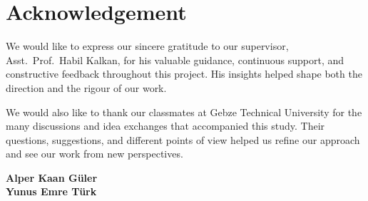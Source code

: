 \chapter*{Acknowledgement}

We would like to express our sincere gratitude to our supervisor,
Asst.\ Prof.\ Habil Kalkan, for his valuable guidance, continuous support, and
constructive feedback throughout this project. His insights helped shape both the
direction and the rigour of our work.

We would also like to thank our classmates at Gebze Technical University for the many
discussions and idea exchanges that accompanied this study. Their questions, suggestions,
and different points of view helped us refine our approach and see our work from new
perspectives.
\vspace{1cm}
\begin{flushright}
\textbf{Alper Kaan Güler \\ Yunus Emre Türk}
\end{flushright}
\clearpage